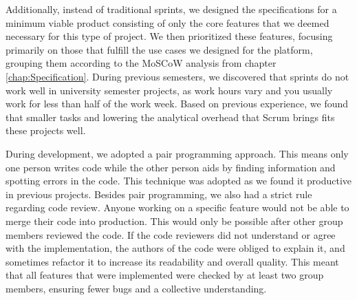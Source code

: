 Additionally, instead of traditional sprints, we designed the specifications for a minimum viable product consisting of only the core features that we deemed necessary for this type of project.
We then prioritized these features, focusing primarily on those that fulfill the use cases we designed for the platform, grouping them according to the MoSCoW analysis from chapter \ref{chap:Specification}.
During previous semesters, we discovered that sprints do not work well in university semester projects, as work hours vary and you usually work for less than half of the work week.
Based on previous experience, we found that smaller tasks and lowering the analytical overhead that Scrum brings fits these projects well.

During development, we adopted a pair programming approach. This means only one person writes code while the other person aids by finding information and spotting errors in the code. This technique was adopted as we found it productive in previous projects.
Besides pair programming, we also had a strict rule regarding code review. Anyone working on a specific feature would not be able to merge their code into production. This would only be possible after other group members reviewed the code.
If the code reviewers did not understand or agree with the implementation, the authors of the code were obliged to explain it, and sometimes refactor it to increase its readability and overall quality.
This meant that all features that were implemented were checked by at least two group members, ensuring fewer bugs and a collective understanding.


